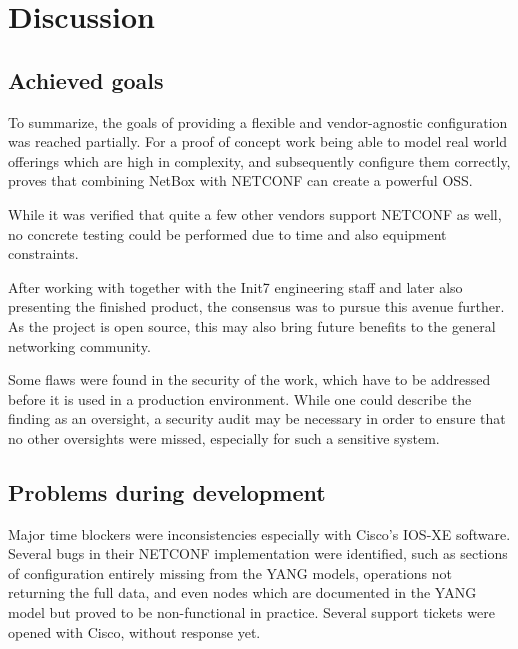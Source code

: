 \chapter{\label{discussion}Discussion}
\thispagestyle{fancy}

\section{Achieved goals}

To summarize, the goals of providing a flexible and vendor-agnostic configuration was reached
partially. For a proof of concept work being able to model
real world offerings which are high in complexity, and subsequently configure them correctly,
proves that combining NetBox with NETCONF can create a powerful \acrshort{OSS}.

While it was verified that quite a few other vendors support NETCONF as well, no concrete
testing could be performed due to time and also equipment constraints.

After working with together with the Init7 engineering staff and later also presenting
the finished product, the consensus was to pursue this avenue further. As the project
is open source, this may also bring future benefits to the general networking community.

Some flaws were found in the security of the work, which have to be addressed before
it is used in a production environment. While one could describe the finding as an
oversight, a security audit may be necessary in order to ensure that no other
oversights were missed, especially for such a sensitive system.

\section{Problems during development}

Major time blockers were inconsistencies especially with Cisco's IOS-XE software.
Several bugs in their NETCONF implementation were identified, such as sections of configuration
entirely missing from the YANG models,  operations not returning the full data,
and even  nodes which are documented in the YANG model but proved to be non-functional
in practice. Several support tickets were opened with Cisco, without response yet.

